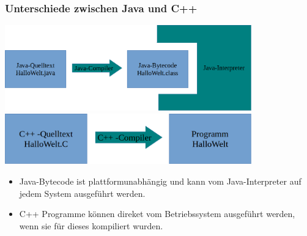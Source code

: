 \begin{frame}[t]%
  \frametitle{Unterschiede zwischen Java und C++}%
\centering
\medskip

\includegraphics[width=0.8\textwidth]{grundl-java/Java-Kompiler}\\[2em]

\includegraphics[width=0.8\textwidth]{grundl-java/C++-Kompiler}

\begin{itemize}
 \item Java-Bytecode ist plattformunabhängig und kann vom Java-Interpreter auf jedem System ausgeführt werden.
 \item C++ Programme können direket vom Betriebssystem ausgeführt werden, wenn sie für dieses kompiliert wurden.
\end{itemize}

\end{frame}
